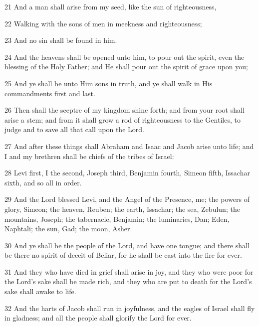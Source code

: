 \par 21 And a man shall arise from my seed, like the sun of righteousness,

\par 22 Walking with the sons of men in meekness and righteousness;

\par 23 And no sin shall be found in him.

\par 24 And the heavens shall be opened unto him, to pour out the spirit, even the blessing of the Holy Father; and He shall pour out the spirit of grace upon you;

\par 25 And ye shall be unto Him sons in truth, and ye shall walk in His commandments first and last.

\par 26 Then shall the sceptre of my kingdom shine forth; and from your root shall arise a stem; and from it shall grow a rod of righteousness to the Gentiles, to judge and to save all that call upon the Lord.

\par 27 And after these things shall Abraham and Isaac and Jacob arise unto life; and I and my brethren shall be chiefs of the tribes of Israel:

\par 28 Levi first, I the second, Joseph third, Benjamin fourth, Simeon fifth, Issachar sixth, and so all in order.

\par 29 And the Lord blessed Levi, and the Angel of the Presence, me; the powers of glory, Simeon; the heaven, Reuben; the earth, Issachar; the sea, Zebulun; the mountains, Joseph; the tabernacle, Benjamin; the luminaries, Dan; Eden, Naphtali; the sun, Gad; the moon, Asher.

\par 30 And ye shall be the people of the Lord, and have one tongue; and there shall be there no spirit of deceit of Beliar, for he shall be cast into the fire for ever.

\par 31 And they who have died in grief shall arise in joy, and they who were poor for the Lord's sake shall be made rich, and they who are put to death for the Lord's sake shall awake to life.

\par 32 And the harts of Jacob shall run in joyfulness, and the eagles of Israel shall fly in gladness; and all the people shall glorify the Lord for ever.

